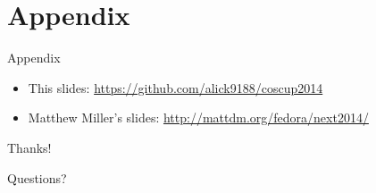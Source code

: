 \documentclass{beamer}
\begin{document}
\section*{Appendix}

\begin{frame}{Appendix}
  \begin{itemize}
    \item This slides: \url{https://github.com/alick9188/coscup2014}
    \item Matthew Miller's slides: \url{http://mattdm.org/fedora/next2014/}
  \end{itemize}
\end{frame}

\begin{frame}
  \begin{center}
    {\LARGE Thanks!
    \bigskip

    Questions?}

  \end{center}
\end{frame}
\end{document}
